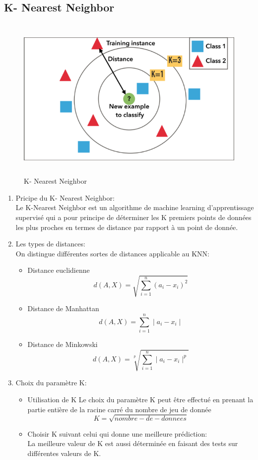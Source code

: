 \subsection{K- Nearest Neighbor}
\begin{figure}[h]
\begin{center}
\includegraphics[width=15cm,height=8cm]{images/knn_sheama.png}
\caption[K- Nearest Neighbor]{K- Nearest Neighbor}
\label{monlabel}
\end{center}
\end{figure}
\begin{enumerate}
\item Pricipe du K- Nearest Neighbor:\\
Le K-Nearest Neighbor est un algorithme de machine learning d’apprentissage supervisé qui a pour principe de déterminer les K premiers points de données les plus proches en termes de distance par rapport à un point de donnée. 
\item Les types de distances:\\
On distingue différentes sortes de distances applicable au KNN:
\begin{itemize}
		\item Distance euclidienne
		$$d(A,X) = \sqrt{\sum_{i=1}^{n} (a_{i}-x_{i})^{2}}$$
		\item Distance de Manhattan\\
		$$d(A,X) = \sum_{i=1}^{n} \mid{a_{i}-x_{i}}\mid$$
		\item Distance de Minkowski
		$$d(A,X) = \sqrt[p]{\sum_{i=1}^{n} \mid{a_{i}-x_{i}}\mid^{p}}$$
\end{itemize}
\item Choix du paramètre K:
\begin{itemize}
		\item Utilisation de K
		Le choix du paramètre K peut être effectué en prenant la partie entière de la racine carré du nombre de jeu de donnée 
		$$K=\sqrt{nombre-de-donnees }$$
		\item Choisir K suivant celui qui donne une meilleure prédiction:\\		
		La meilleure valeur de K est aussi déterminée en faisant des tests sur différentes valeurs de K.
\end{itemize}
\end{enumerate}
